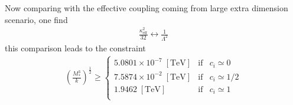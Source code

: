 Now comparing with the effective coupling coming from large extra dimension scenario, one find 
\begin{align}
 \frac{\kappa_{\text{eff}}^2}{32} \longleftrightarrow \frac{1}{\Lambda^2}
\end{align}
this comparison leads to the constraint
\begin{align}
\label{parconst}
\left(\frac{M_*^3}{k}\right)^{\frac{1}{2}}\geq \left\{ \begin{matrix}
                                                        5.0801\times10^{-7}\;[\text{TeV}]& \text{if} & c_i\simeq0 \\
                                                        7.5874\times10^{-2}\; [\text{TeV}]& \text{if} & c_i\simeq1/2 \\
                                                        1.9462\;[\text{TeV}]& \text{if} & c_i\simeq1 \\
                                                       \end{matrix} \right.
\end{align}


